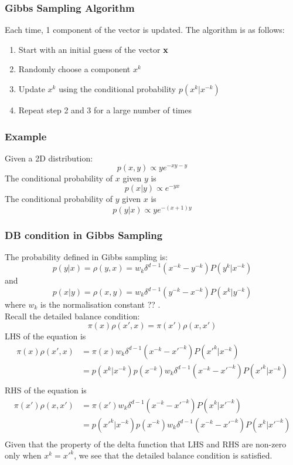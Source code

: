 \documentclass[12pt,a4paper]{article}
\begin{document}
\subsubsection{Gibbs Sampling Algorithm}
Each time, 1 component of the vector is updated. The algorithm is as follows:
\begin{enumerate}
    \item Start with an initial guess of the vector $\vb{x}$
    \item Randomly choose a component $x^k$
    \item Update $x^k$ using the conditional probability $p(x^k|x^{-k})$
    \item Repeat step 2 and 3 for a large number of times
\end{enumerate}
\subsubsection{Example}
Given a 2D distribution:
$$
p(x,y) \propto ye^{-xy-y}
$$
The conditional probability of $x$ given $y$ is
$$
p(x|y) \propto e^{-yx}
$$
The conditional probability of $y$ given $x$ is
$$
p(y|x) \propto ye^{-(x+1)y}
$$
\subsubsection{DB condition in Gibbs Sampling}
The probability defined in Gibbs sampling is:
$$
p(y|x) = \rho(y,x) = w_k \delta^{d-1}(x^{-k} - y^{-k})P(y^k|x^{-k})
$$
and 
$$
p(x|y) = \rho(x,y) = w_k \delta^{d-1}(y^{-k} - x^{-k})P(x^k|y^{-k})
$$
where $w_k$ is the normalisation constant ?? .\\
Recall the detailed balance condition:
$$
\pi(x)\rho(x',x) = \pi(x')\rho(x,x')
$$
LHS of the equation is
\begin{align*}
    \pi(x)\rho(x',x) &= \pi(x)w_k \delta^{d-1}(x^{-k} - x'^{-k})P(x'^k|x^{-k}) \\
    &= p(x^k|x^{-k})p(x^{-k})w_k \delta^{d-1}(x^{-k} - x'^{-k})P(x'^k|x^{-k}) \\
\end{align*}
RHS of the equation is
\begin{align*}
    \pi(x')\rho(x,x') &= \pi(x')w_k \delta^{d-1}(x^{-k} - x'^{-k})P(x^k|x'^{-k}) \\
    &= p(x'^k|x^{-k})p(x^{-k})w_k \delta^{d-1}(x^{-k} - x'^{-k})P(x^k|x'^{-k}) \\
\end{align*}
Given that the property of the delta function that LHS and RHS are non-zero only when $x^k = x'^k$, we see that the detailed balance condition is satisfied.\\
\end{document}
